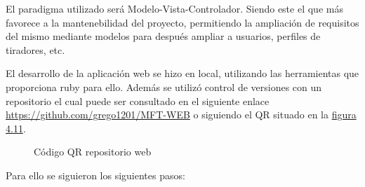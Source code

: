 El paradigma utilizado será Modelo-Vista-Controlador. Siendo este el que más
favorece a la mantenebilidad del proyecto, permitiendo la ampliación de requisitos
del mismo mediante modelos para después ampliar a usuarios, perfiles de tiradores,
etc.

El desarrollo de la aplicación web se hizo en local, utilizando las herramientas
que proporciona ruby para ello. Además se utilizó control de versiones con un repositorio
el cual puede ser consultado en el siguiente enlace \url{https://github.com/grego1201/MFT-WEB}
o siguiendo el QR situado en la \hyperref[fig:Código QR repositorio web]{figura 4.11}.

\begin{figure}[htb]
  \centering
  \caption[Código QR repositorio web]{Código QR repositorio web}
  \label{fig:Código QR repositorio web}
\end{figure}

Para ello se siguieron los siguientes pasos:

